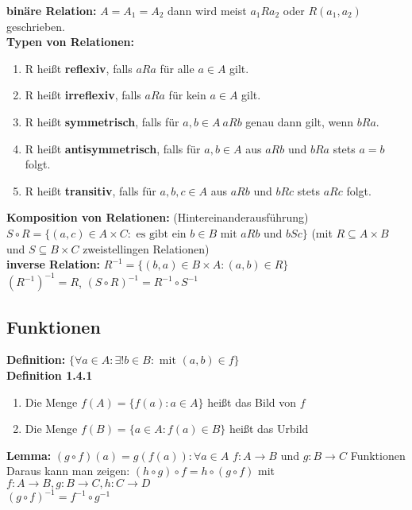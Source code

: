 \textbf{binäre Relation:} $A=A_1=A_2$ dann wird meist $a_1Ra_2$ oder $R(a_1,a_2)$ geschrieben.\\

\textbf{Typen von Relationen:}
\begin{enumerate}
    \item R heißt \textbf{reflexiv}, falls $aRa$ für alle $a\in A$ gilt.
    \item R heißt \textbf{irreflexiv}, falls $aRa$ für kein $a\in A$ gilt.
    \item R heißt \textbf{symmetrisch}, falls für $a,b \in A\ aRb$ genau dann gilt, wenn $bRa$.
    \item R heißt \textbf{antisymmetrisch}, falls für $a,b \in A$ aus $aRb$ und $bRa$ stets $a=b$ folgt.
    \item R heißt \textbf{transitiv}, falls für $a,b,c \in A $ aus $aRb$ und $bRc$ stets $aRc$ folgt.
\end{enumerate}

\textbf{Komposition von Relationen:} (Hintereinanderausführung) $S\circ R = \{(a,c) \in A\times C : \text{ es gibt ein }b\in B \text{ mit } aRb \text{ und } bSc \}$ (mit $R\subseteq A\times B$ und $S \subseteq B\times C$ zweistellingen Relationen)\\

\textbf{inverse Relation:} $R^{-1}= \{(b,a) \in B\times A:(a,b)\in R\}$\\
${(R^{-1})}^{-1} = R$, $(S \circ R)^{-1} = R^{-1} \circ S^{-1}$\\



\subsection{Funktionen}

\textbf{Definition:} $\{\forall a \in A: \exists ! b\in B : \text{ mit } (a,b)\in f\}$\\

\textbf{Definition 1.4.1}
\begin{enumerate}
    \item Die Menge $f(A) = \{f(a) : a \in A \}$ heißt das Bild von $f$
    \item Die Menge $f(B) = \{a \in A : f(a) \in B\}$ heißt das Urbild
\end{enumerate}

\textbf{Lemma:} $(g\circ f)(a)=g(f(a)) : \forall a \in A$ $f:A\rightarrow B$ und $g:B\rightarrow C$ Funktionen\\
Daraus kann man zeigen: $(h \circ g)\circ f = h \circ (g\circ f)$ mit $f: A\rightarrow B, g: B\rightarrow C, h: C\rightarrow D$\\
$(g\circ f)^{-1}=f^{-1}\circ g ^{-1}$\\

